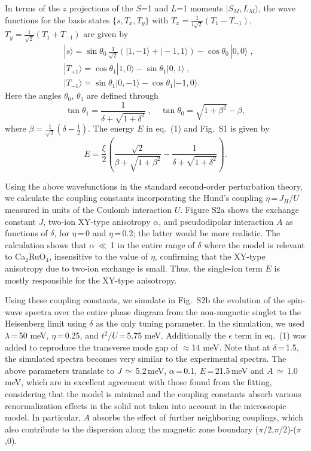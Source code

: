 \documentclass[twocolumn,prb,aps,showpacs]{revtex4-1}
\newcommand{\CROns}{Ca$_2$RuO$_4$}
\begin{document}
In terms of the $z$ projections of the $S$=1 and $L$=1 
moments $\lvert S_M, L_M\rangle$, the wave functions for the basis states $\{s,T_x,T_y\}$ with 
$T_x=\frac1{i\sqrt2}(T_1-T_{-1})$, $T_y=\frac1{\sqrt2}(T_1+T_{-1})$ are given by 
%
\begin{align}
&|s\rangle = \sin\theta_0 \,\tfrac1{\sqrt2}(|1,-1\rangle+|-1,1\rangle)
           -\cos\theta_0 \,|0,0\rangle \;, \\
&|T_{+1}\rangle = \cos\theta_1 |1,0\rangle - \sin\theta_1 |0,1\rangle \;, \\
&|T_{-1}\rangle = \sin\theta_1 |0,-1\rangle - \cos\theta_1 |-1,0\rangle.
\end{align}
%
Here the angles $\theta_0$, $\theta_1$ are defined through
\begin{equation}
\tan\theta_1 = \frac1{\delta+\sqrt{1+\delta^2}} \;, \quad
\tan\theta_0 = \sqrt{1+\beta^2}-\beta, 
\end{equation}
where $\beta=\frac1{\sqrt2}(\delta-\frac12)$. 
The energy $E$ in eq.~(1) and Fig.~S1 is given by
\begin{equation}
E=\frac{\xi}{2} \left(\frac{\sqrt{2}}{\beta+\sqrt{1+\beta^2}}-\frac{1}{\delta+\sqrt{1+\delta^2}}\right).
\end{equation}



Using the above wavefunctions in the standard second-order perturbation theory, we calculate the coupling constants incorporating the Hund's coupling $\eta$\,=\,$J_H$/$U$ measured in units of the Coulomb interaction $U$. Figure S2a shows the exchange constant $J$, two-ion XY-type anisotropy $\alpha$, and pseudodipolar interaction $A$ as functions of $\delta$,
for $\eta$\,=\,0 and $\eta$\,=\,0.2; the latter would be more realistic. The calculation shows
that $\alpha$\,$\ll$\,1 in the entire range of $\delta$ where the model is relevant to \CROns, insensitive to the value
of $\eta$,
confirming that the XY-type anisotropy due to two-ion exchange is small. Thus, the single-ion term $E$ is mostly responsible for the XY-type anisotropy.


Using these coupling constants, we simulate in Fig.~S2b the evolution of the spin-wave spectra over the entire phase diagram from the non-magnetic singlet to the Heisenberg limit using $\delta$ as the only tuning parameter. In the simulation, we used $\lambda$\,=\,50 meV, $\eta$\,=\,0.25, and $t^2/U$\,=\,5.75 meV. Additionally the $\epsilon$ term in eq.~(1) was added to reproduce the transverse mode gap of $\approx$14 meV. Note that at $\delta$\,=\,1.5, the simulated spectra becomes very similar to the experimental spectra. The above parameters translate to $J$\,$\simeq$\,5.2\,meV, $\alpha$\,=\,0.1, $E$\,=\,21.5\,meV and $A$\,$\simeq$\,1.0\,meV, which are in excellent agreement with those found from the fitting, considering that the model is minimal and the coupling constants absorb various renormalization effects in the solid not taken into account in the microscopic model. In particular, $A$ absorbs the effect of further neighboring couplings, which also contribute to the dispersion along the magnetic zone boundary ($\pi$/2,$\pi$/2)-($\pi$,0).
\end{document}
